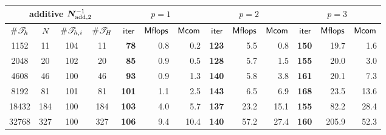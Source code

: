  {\footnotesize
      \tabcolsep 4pt
  \begin{tabular}{cccc|rrr|rrr|rrr}
  \hline
  \multicolumn{4}{c|}{ {\small\bf additive} $\bm{N}_{\mathrm{add},2}^{-1}$     }  &  \multicolumn{3}{c|}{$p=1$} & \multicolumn{3}{c|}{$p=2$}&   \multicolumn{3}{c}{$p=3$}\\
  \hline
     $ \# {{\mathscr T}_h} $   &
     $ N $ & $ \# {{\mathscr T}_{h,i}} $   &
     $ \# {{\mathscr T}_H} $ & 
     $ \mathsf{iter} $ & $ \mathsf{Mflops} $ & $ \mathsf{Mcom} $ & 
     $ \mathsf{iter} $ & $ \mathsf{Mflops} $ & $ \mathsf{Mcom} $ & 
     $ \mathsf{iter} $ & $ \mathsf{Mflops} $ & $ \mathsf{Mcom} $ \\ 
  \hline
    1152 &       11 &      104 &       11
& {\bf       78}  &        0.8 &        0.2
& {\bf      123}  &        5.5 &        0.8
& {\bf      150}  &       19.7 &        1.6
 \\
    2048 &       20 &      102 &       20
& {\bf       85}  &        0.9 &        0.5
& {\bf      128}  &        5.7 &        1.5
& {\bf      155}  &       20.0 &        3.0
 \\
    4608 &       46 &      100 &       46
& {\bf       93}  &        0.9 &        1.3
& {\bf      140}  &        5.8 &        3.8
& {\bf      161}  &       20.1 &        7.3
 \\
    8192 &       81 &      101 &       81
& {\bf      101}  &        1.1 &        2.5
& {\bf      143}  &        6.5 &        6.9
& {\bf      168}  &       23.5 &       13.6
 \\
   18432 &      184 &      100 &      184
& {\bf      103}  &        4.0 &        5.7
& {\bf      137}  &       23.2 &       15.1
& {\bf      155}  &       82.2 &       28.4
 \\
   32768 &      327 &      100 &      327
& {\bf      106}  &        9.4 &       10.4
& {\bf      140}  &       57.2 &       27.4
& {\bf      160}  &      205.9 &       52.3
 \\
  \hline
  \end{tabular}
 }
